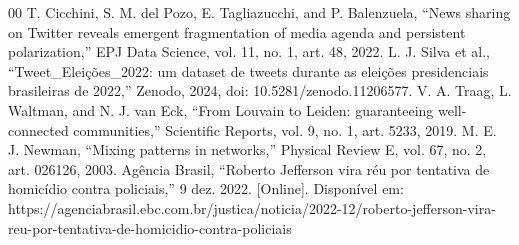 \documentclass[conference]{IEEEtran}
\begin{document}
\begin{thebibliography}{00}
 T. Cicchini, S. M. del Pozo, E. Tagliazucchi, and P. Balenzuela, ``News sharing on Twitter reveals emergent fragmentation of media agenda and persistent polarization,'' EPJ Data Science, vol. 11, no. 1, art. 48, 2022.
 L. J. Silva et al., ``Tweet\_Eleições\_2022: um dataset de tweets durante as eleições presidenciais brasileiras de 2022,'' Zenodo, 2024, doi: 10.5281/zenodo.11206577.
 V. A. Traag, L. Waltman, and N. J. van Eck, ``From Louvain to Leiden: guaranteeing well-connected communities,'' Scientific Reports, vol. 9, no. 1, art. 5233, 2019.
 M. E. J. Newman, ``Mixing patterns in networks,'' Physical Review E, vol. 67, no. 2, art. 026126, 2003.
 Agência Brasil, ``Roberto Jefferson vira réu por tentativa de homicídio contra policiais,'' 9 dez. 2022. [Online]. Disponível em: https://agenciabrasil.ebc.com.br/justica/noticia/2022-12/roberto-jefferson-vira-reu-por-tentativa-de-homicidio-contra-policiais
\end{thebibliography}
\end{document}
